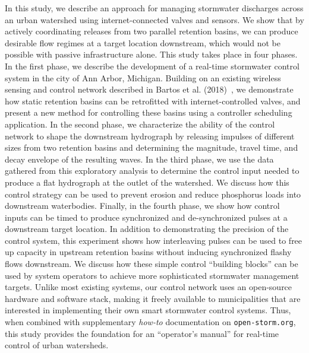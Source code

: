 In this study, we describe an approach for
managing stormwater discharges across an urban watershed using internet-connected valves and sensors.
We show that by actively coordinating releases from two parallel retention basins, we can produce desirable flow regimes at a target location downstream, which would not be possible with passive infrastructure alone.
This study takes place in four phases.
In the first phase, we describe the development of a real-time stormwater control system in the city of Ann Arbor, Michigan. Building on an existing wireless sensing and control network described in Bartos et al. (2018)~\cite{Bartos_2018}, we demonstrate how static retention basins can be retrofitted with internet-controlled valves, and present a new method for controlling these basins using a controller scheduling application. In the second phase, we characterize the ability of the control network to shape the downstream hydrograph by releasing impulses of different sizes from two retention basins and determining the magnitude, travel time, and decay envelope of the resulting waves.  In the third phase, we use the data gathered from this exploratory analysis to determine the control input needed to produce a flat hydrograph at the outlet of the watershed. We discuss how this control strategy can be used to prevent erosion and reduce phosphorus loads into downstream waterbodies.
Finally, in the fourth phase, we show how control inputs can be timed to produce synchronized and de-synchronized pulses at a downstream target location. In addition to demonstrating the precision of the control system, this experiment shows how interleaving pulses can be used to free up capacity in upstream retention basins without inducing synchronized flashy flows downstream. We discuss how these simple control ``building blocks'' can be used by system operators to achieve more sophisticated stormwater management targets. Unlike most existing systems, our control network uses an open-source hardware and software stack, making it freely available to municipalities that are interested in implementing their own smart stormwater control systems. Thus, when combined with supplementary \textit{how-to} documentation on \texttt{open-storm.org}, this study provides
the foundation for an ``operator's manual'' for real-time control of urban watersheds.

